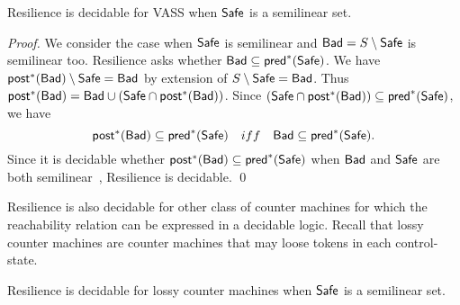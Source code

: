 \begin{theorem}\label{SL VASS}
{\sc Resilience} is decidable for VASS when $\Safe$ 
is a semilinear set.
\end{theorem}

\begin{proof}
\iffalse When asking about {\sc Resilience}, in context, there are no true ``neutral'' configurations.
Indeed, from a VASS $V$, $\Safe$ and $\Bad$ semilinear, one can build VASS $V'$, $\Safe'$ semilinear, and $\Bad'$ complement of $\Safe'$ such that {\sc Resilience} holds for
$V$, $\Safe$ and $\Bad$ if and only if {\sc Resilience} holds for
$V'$, $\Safe'$ and $\Bad'$. For the construction, $V'$ will have two copies of the control states of $V$; $Q_{A}$ and $Q_{B}$, and will have two other VASS running in parallel checking whether or not the current configuration belong to $\Safe$ resp. $\Bad$. 
From a configuration with state in $Q_{A}$ you go to $Q_B$ when you are in a $\Bad$ place
and from a configuration with state in $Q_{B}$ you go to $Q_{A}$ when you are in a $\Safe$ place.
$\Safe'$ is $Q_A \times \N^d$ and $\Bad'$ is $Q_B \times N^d$.

Without loss of generality hence let us consider only \fi
We consider the case when $\Safe$ is semilinear
and $\textsf{Bad} = S \setminus \textsf{Safe}$ is semilinear too.
{\sc Resilience} asks whether $\textsf{Bad} \subseteq \textsf{pred}^*(\textsf{Safe})$.
We have $\textsf{post}^*(\textsf{Bad}) \setminus \textsf{Safe} = \textsf{Bad}$ by extension of $S \setminus \textsf{Safe} = \textsf{Bad}$.
Thus $\textsf{post}^*(\textsf{Bad}) = \textsf{Bad} \cup (\textsf{Safe} \cap \textsf{post}^*(\textsf{Bad}))$. Since $(\textsf{Safe} \cap \textsf{post}^*(\textsf{Bad})) \subseteq \textsf{pred}^*(\textsf{Safe})$, we have
\[\textsf{post}^*(\textsf{Bad}) \subseteq \textsf{pred}^*(\textsf{Safe}) \quad iff \quad \textsf{Bad} \subseteq \textsf{pred}^*(\textsf{Safe}).\]
Since it is decidable whether $\textsf{post}^*(\textsf{Bad}) \subseteq \textsf{pred}^*(\textsf{Safe})$ when 
$\Bad$ and $\Safe$ are both semilinear~\cite{DBLP:journals/corr/abs-2207-02697}, 
{\sc Resilience} is decidable. \qed
\end{proof}

{\sc Resilience} is also decidable for other class of counter machines for which the reachability relation can be expressed in a decidable logic. Recall that lossy counter machines \cite{DBLP:conf/rp/Schnoebelen10} are counter machines that may loose tokens in each control-state.

\begin{theorem}\label{SL Lossy}
{\sc Resilience} is decidable for lossy counter machines when $\Safe$ 
is a semilinear set.
\end{theorem}

